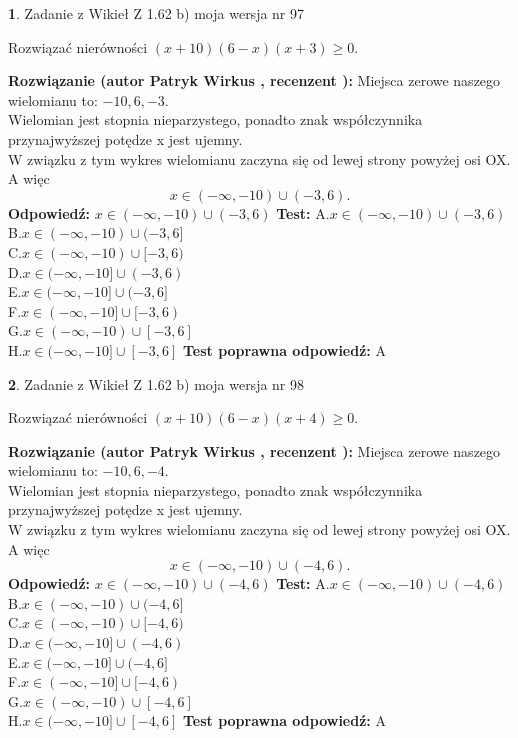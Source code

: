 \documentclass[12pt, a4paper]{article}
\theoremstyle{definition} %
\newtheorem{zad}{}
\newcommand{\zadStart}[1]{\begin{zad}#1\newline}
\newcommand{\zadStop}{\end{zad}}
\newcommand{\rozwStart}[2]{\noindent \textbf{Rozwiązanie (autor #1 , recenzent #2): }\newline}
\newcommand{\rozwStop}{\newline}
\newcommand{\odpStart}{\noindent \textbf{Odpowiedź:}\newline}
\newcommand{\odpStop}{\newline}
\newcommand{\testStart}{\noindent \textbf{Test:}\newline}
\newcommand{\testStop}{\newline}
\newcommand{\kluczStart}{\noindent \textbf{Test poprawna odpowiedź:}\newline}
\newcommand{\kluczStop}{\newline}
\begin{document}
\zadStart{Zadanie z Wikieł Z 1.62 b) moja wersja nr 97}

Rozwiązać nierówności $(x+10)(6-x)(x+3)\ge0$.
\zadStop
\rozwStart{Patryk Wirkus}{}
Miejsca zerowe naszego wielomianu to: $-10, 6, -3$.\\
Wielomian jest stopnia nieparzystego, ponadto znak współczynnika przy\linebreak najwyższej potędze x jest ujemny.\\ W związku z tym wykres wielomianu zaczyna się od lewej strony powyżej osi OX. A więc $$x \in (-\infty,-10) \cup (-3,6).$$
\rozwStop
\odpStart
$x \in (-\infty,-10) \cup (-3,6)$
\odpStop
\testStart
A.$x \in (-\infty,-10) \cup (-3,6)$\\
B.$x \in (-\infty,-10) \cup (-3,6]$\\
C.$x \in (-\infty,-10) \cup [-3,6)$\\
D.$x \in (-\infty,-10] \cup (-3,6)$\\
E.$x \in (-\infty,-10] \cup (-3,6]$\\
F.$x \in (-\infty,-10] \cup [-3,6)$\\
G.$x \in (-\infty,-10) \cup [-3,6]$\\
H.$x \in (-\infty,-10] \cup [-3,6]$
\testStop
\kluczStart
A
\kluczStop



\zadStart{Zadanie z Wikieł Z 1.62 b) moja wersja nr 98}

Rozwiązać nierówności $(x+10)(6-x)(x+4)\ge0$.
\zadStop
\rozwStart{Patryk Wirkus}{}
Miejsca zerowe naszego wielomianu to: $-10, 6, -4$.\\
Wielomian jest stopnia nieparzystego, ponadto znak współczynnika przy\linebreak najwyższej potędze x jest ujemny.\\ W związku z tym wykres wielomianu zaczyna się od lewej strony powyżej osi OX. A więc $$x \in (-\infty,-10) \cup (-4,6).$$
\rozwStop
\odpStart
$x \in (-\infty,-10) \cup (-4,6)$
\odpStop
\testStart
A.$x \in (-\infty,-10) \cup (-4,6)$\\
B.$x \in (-\infty,-10) \cup (-4,6]$\\
C.$x \in (-\infty,-10) \cup [-4,6)$\\
D.$x \in (-\infty,-10] \cup (-4,6)$\\
E.$x \in (-\infty,-10] \cup (-4,6]$\\
F.$x \in (-\infty,-10] \cup [-4,6)$\\
G.$x \in (-\infty,-10) \cup [-4,6]$\\
H.$x \in (-\infty,-10] \cup [-4,6]$
\testStop
\kluczStart
A
\kluczStop
\end{document}
